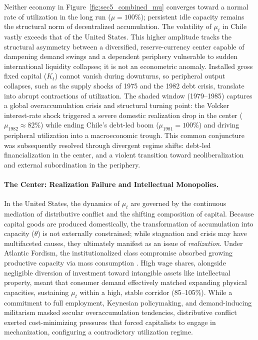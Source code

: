 Neither economy in Figure~\ref{fig:sec5_combined_mu} converges toward a normal rate of utilization in the long run ($\mu = 100\%$); persistent idle capacity remains the structural norm of decentralized accumulation. The volatility of $\mu_t$ in Chile vastly exceeds that of the United States. This higher amplitude tracks the structural asymmetry between a diversified, reserve-currency center capable of dampening demand swings and a dependent periphery vulnerable to sudden international liquidity collapses; it is not an econometric anomaly. Installed gross fixed capital ($K_t$) cannot vanish during downturns, so peripheral output collapses, such as the supply shocks of 1975 and the 1982 debt crisis, translate into abrupt contractions of utilization. The shaded window (1979--1985) captures a global overaccumulation crisis and structural turning point: the Volcker interest-rate shock triggered a severe domestic realization drop in the center ($\mu_{1982} \approx 82\%$) while ending Chile's debt-led boom ($\mu_{1981} = 100\%$) and driving peripheral utilization into a macroeconomic trough. This common conjuncture was subsequently resolved through divergent regime shifts: debt-led financialization in the center, and a violent transition toward neoliberalization and external subordination in the periphery.

\paragraph{The Center: Realization Failure and Intellectual Monopolies.} 
In the United States, the dynamics of $\mu_t$ are governed by the continuous mediation of distributive conflict and the shifting composition of capital. Because capital goods are produced domestically, the transformation of accumulation into capacity ($\theta$) is not externally constrained; while stagnation and crisis may have multifaceted causes, they ultimately manifest as an issue of \textit{realization}. Under Atlantic Fordism, the institutionalized class compromise absorbed growing productive capacity via mass consumption \citep{Aglietta2000}. High wage shares, alongside negligible diversion of investment toward intangible assets like intellectual property, meant that consumer demand effectively matched expanding physical capacities, sustaining $\mu_t$ within a high, stable corridor (85--105\%). While a commitment to full employment, Keynesian policymaking, and demand-inducing militarism masked secular overaccumulation tendencies, distributive conflict exerted cost-minimizing pressures that forced capitalists to engage in mechanization, configuring a contradictory utilization regime. 

